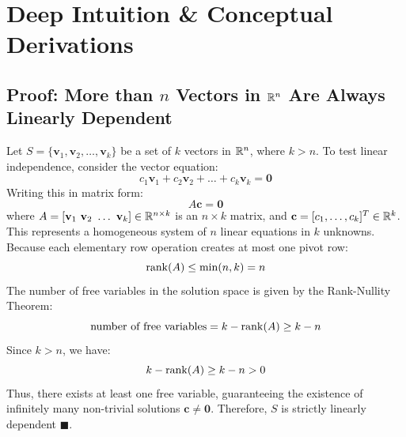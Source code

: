 \section{Deep Intuition \& Conceptual Derivations}

\subsection{Proof: More than $n$ Vectors in $\mathbb{R}^n$ Are Always Linearly Dependent}
Let $S = \{\mathbf{v}_1, \mathbf{v}_2, \dots, \mathbf{v}_k\}$ be a set of $k$ vectors in $\mathbb{R}^n$, where $k > n$.
To test linear independence, consider the vector equation:
\begin{equation}
c_1 \mathbf{v}_1 + c_2 \mathbf{v}_2 + \dots + c_k \mathbf{v}_k = \mathbf{0}
\end{equation}
Writing this in matrix form:
\begin{equation}
A \mathbf{c} = \mathbf{0}
\end{equation}
where $A = [\mathbf{v}_1 \ \mathbf{v}_2 \ \dots \ \mathbf{v}_k] \in \R^{n \times k}$ is an $n \times k$ matrix, and $\mathbf{c} = [c_1, \dots, c_k]^T \in \mathbb{R}^k$.
This represents a homogeneous system of $n$ linear equations in $k$ unknowns.
Because each elementary row operation creates at most one pivot row:
\begin{equation}
\operatorname{rank}(A) \le \min(n, k) = n
\end{equation}
The number of free variables in the solution space is given by the Rank-Nullity Theorem:
\begin{equation}
\text{number of free variables} = k - \operatorname{rank}(A) \ge k - n
\end{equation}
Since $k > n$, we have:
\begin{equation}
k - \operatorname{rank}(A) \ge k - n > 0
\end{equation}
Thus, there exists at least one free variable, guaranteeing the existence of infinitely many non-trivial solutions $\mathbf{c} \neq \mathbf{0}$. 
Therefore, $S$ is strictly linearly dependent $\blacksquare$.

